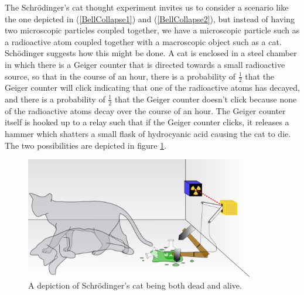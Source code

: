 The Schr\"{o}dinger's cat thought experiment invites us to consider a scenario like the one depicted in (\ref{BellCollapse1}) and (\ref{BellCollapse2}), but instead of having two microscopic particles coupled together, we have a microscopic particle such as a radioactive atom coupled together with a macroscopic object such as a cat. Sch\"{o}dinger suggests how this might be done. A cat is enclosed in a steel chamber in which there is a Geiger counter that is directed towards a small radioactive source, so that in the course of an hour, there is a probability of $\frac{1}{2}$ that the Geiger counter will click indicating that one of the radioactive atoms has decayed, and there is a probability of $\frac{1}{2}$ that the Geiger counter doesn't click because none of the radioactive atoms decay over the course of an hour. The Geiger counter itself is hooked up to a relay such that if the Geiger counter clicks, it releases a hammer which shatters a small flask of hydrocyanic acid causing the cat to die. The two possibilities are depicted in figure \ref{deadlivecat}.
\begin{figure}[ht!]
    \captionsetup{justification=justified}
    \centering
    \includegraphics[width=100mm]{Chapter03/Schrodingers_cat.png}
    \caption[Depiction of Schr\"{o}dinger's cat]{A depiction of Schr\"{o}dinger's cat being both dead and alive.\protect\footnotemark}
    \label{deadlivecat}
    \end{figure}
    
